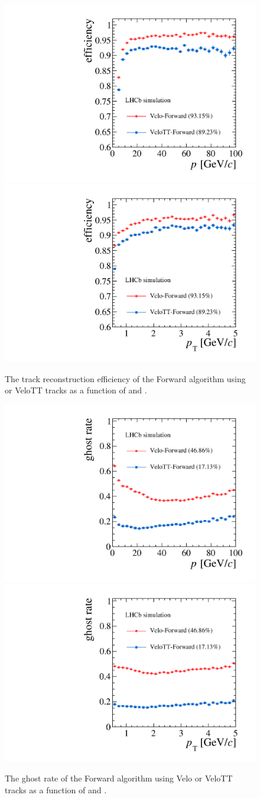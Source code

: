 \begin{figure}[!tb]
  \begin{center}
    \includegraphics[width=0.45\linewidth]{figs/upstream-tracking-run2/Forward-eff-p.pdf}
    \includegraphics[width=0.45\linewidth]{figs/upstream-tracking-run2/Forward-eff-pt.pdf}
    \caption{The track reconstruction efficiency of the Forward algorithm using \velo or VeloTT tracks as a function of \ptot and \pt.}
    \label{fig:eff_forward_run2_comp}
  \end{center}
\end{figure}

\begin{figure}[!tb]
  \begin{center}
    \includegraphics[width=0.45\linewidth]{figs/upstream-tracking-run2/Forward-gr-p.pdf}
    \includegraphics[width=0.45\linewidth]{figs/upstream-tracking-run2/Forward-gr-pt.pdf}
    \caption{The ghost rate of the Forward algorithm using Velo or VeloTT tracks as a function of \ptot and \pt.}
    \label{fig:gr_forward_run2_comp}
  \end{center}
\end{figure}

